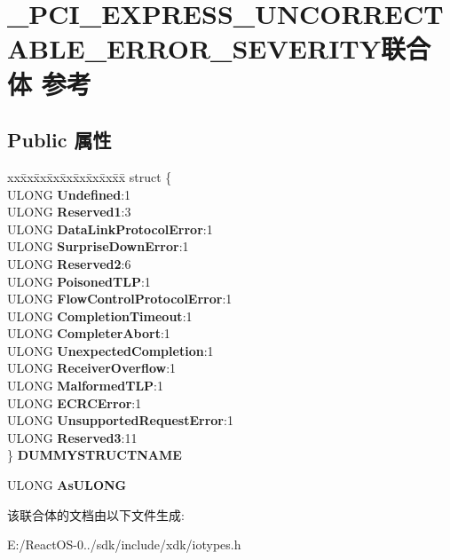 \hypertarget{union___p_c_i___e_x_p_r_e_s_s___u_n_c_o_r_r_e_c_t_a_b_l_e___e_r_r_o_r___s_e_v_e_r_i_t_y}{}\section{\+\_\+\+P\+C\+I\+\_\+\+E\+X\+P\+R\+E\+S\+S\+\_\+\+U\+N\+C\+O\+R\+R\+E\+C\+T\+A\+B\+L\+E\+\_\+\+E\+R\+R\+O\+R\+\_\+\+S\+E\+V\+E\+R\+I\+T\+Y联合体 参考}
\label{union___p_c_i___e_x_p_r_e_s_s___u_n_c_o_r_r_e_c_t_a_b_l_e___e_r_r_o_r___s_e_v_e_r_i_t_y}
\subsection*{Public 属性}
\begin{DoxyCompactItemize}
\item 
\mbox{\label{union___p_c_i___e_x_p_r_e_s_s___u_n_c_o_r_r_e_c_t_a_b_l_e___e_r_r_o_r___s_e_v_e_r_i_t_y_af086f4386deb5b49b56992ab6984bc3f}} 
\begin{tabbing}
xx\=xx\=xx\=xx\=xx\=xx\=xx\=xx\=xx\=\kill
struct \{\\
\>ULONG {\bfseries Undefined}:1\\
\>ULONG {\bfseries Reserved1}:3\\
\>ULONG {\bfseries DataLinkProtocolError}:1\\
\>ULONG {\bfseries SurpriseDownError}:1\\
\>ULONG {\bfseries Reserved2}:6\\
\>ULONG {\bfseries PoisonedTLP}:1\\
\>ULONG {\bfseries FlowControlProtocolError}:1\\
\>ULONG {\bfseries CompletionTimeout}:1\\
\>ULONG {\bfseries CompleterAbort}:1\\
\>ULONG {\bfseries UnexpectedCompletion}:1\\
\>ULONG {\bfseries ReceiverOverflow}:1\\
\>ULONG {\bfseries MalformedTLP}:1\\
\>ULONG {\bfseries ECRCError}:1\\
\>ULONG {\bfseries UnsupportedRequestError}:1\\
\>ULONG {\bfseries Reserved3}:11\\
\} {\bfseries DUMMYSTRUCTNAME}\\

\end{tabbing}\item 
\mbox{\label{union___p_c_i___e_x_p_r_e_s_s___u_n_c_o_r_r_e_c_t_a_b_l_e___e_r_r_o_r___s_e_v_e_r_i_t_y_a54418f60922c26a198923b1a8269f570}} 
U\+L\+O\+NG {\bfseries As\+U\+L\+O\+NG}
\end{DoxyCompactItemize}


该联合体的文档由以下文件生成\+:\begin{DoxyCompactItemize}
\item 
E\+:/\+React\+O\+S-\/0../sdk/include/xdk/iotypes.\+h\end{DoxyCompactItemize}
